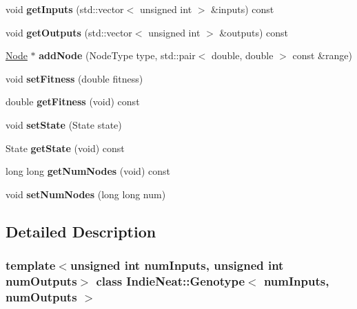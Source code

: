 \begin{DoxyCompactItemize}
void {\bfseries get\+Inputs} (std\+::vector$<$ unsigned int $>$ \&inputs) const
\item 
\mbox{\label{class_indie_neat_1_1_genotype_afd23aecb452ee3377e3da9c225db2cbf}} 
void {\bfseries get\+Outputs} (std\+::vector$<$ unsigned int $>$ \&outputs) const
\item 
\mbox{\label{class_indie_neat_1_1_genotype_a591f9866b698b3c3e687298e1edaa5e9}} 
\hyperlink{class_indie_neat_1_1_genotype_1_1_node}{Node} $\ast$ {\bfseries add\+Node} (Node\+Type type, std\+::pair$<$ double, double $>$ const \&range)
\item 
\mbox{\label{class_indie_neat_1_1_genotype_a61c94ac7533eadc6c710522a5e577977}} 
void {\bfseries set\+Fitness} (double fitness)
\item 
\mbox{\label{class_indie_neat_1_1_genotype_a79a07d4c8ab04900d1630aa86d6eba76}} 
double {\bfseries get\+Fitness} (void) const
\item 
\mbox{\label{class_indie_neat_1_1_genotype_a371bdcc52d4ac1ba306354413a772df4}} 
void {\bfseries set\+State} (State state)
\item 
\mbox{\label{class_indie_neat_1_1_genotype_ab5b6bbab4dbed77350d30a051ab621e7}} 
State {\bfseries get\+State} (void) const
\item 
\mbox{\label{class_indie_neat_1_1_genotype_a3962be224016a1646612027fb1ecf578}} 
long long {\bfseries get\+Num\+Nodes} (void) const
\item 
\mbox{\label{class_indie_neat_1_1_genotype_a7d0ab4939bfe9eef825e7ab5065d1780}} 
void {\bfseries set\+Num\+Nodes} (long long num)
\end{DoxyCompactItemize}


\subsection{Detailed Description}
\subsubsection*{template$<$unsigned int num\+Inputs, unsigned int num\+Outputs$>$\newline
class Indie\+Neat\+::\+Genotype$<$ num\+Inputs, num\+Outputs $>$}

